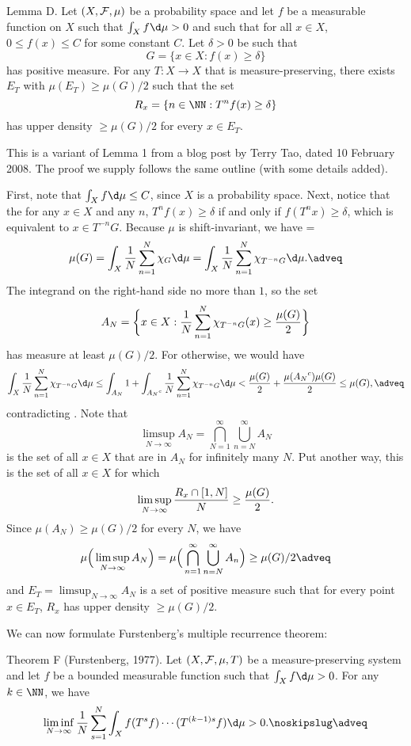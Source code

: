 \proclaim Lemma D. Let $(X,{\cal F},\mu)$ be a probability space and let $f$ be a measurable function on $X$
such that $\int_Xf\d\mu>0$ and such that for all $x\in X$, $0\leq f(x)\leq C$ for some constant $C$.
Let $\delta>0$ be such that
$$G = \{x\in X : f(x)\geq \delta\}$$
has positive measure. For any $T:X\to X$ that is measure-preserving,
there exists $E_T$ with $\mu(E_T)\geq \mu(G)/2$ such that the set
$$R_x = \{n\in \NN : T^nf(x) \geq \delta\}$$
has upper density $\geq \mu(G)/2$ for every $x\in E_T$.

\noindent This is a variant of Lemma 1 from a blog post by Terry Tao, dated 10 February 2008. The
proof we supply follows the same outline (with some details added).

\proof First, note that $\int_Xf\d\mu\leq C$, since $X$ is a probability space. Next, notice that
the for any $x\in X$ and any $n$, $T^nf(x)\geq \delta$ if and only if $f(T^nx)\geq \delta$,
which is equivalent to
$x\in T^{-n}G$. Because $\mu$ is shift-invariant, we have
\newcount\eqA
\eqA=\eqcount
$$\mu(G) = \int_X {1\over N} \sum_{n=1}^N \chi_{G}\d\mu = \int_X{1\over N}\sum_{n=1}^N \chi_{T^{-n}G}\d\mu.\adveq$$
The integrand on the right-hand side no more than $1$, so the set
$$A_N = \bigg\{ x\in X : {1\over N} \sum_{n=1}^N \chi_{T^{-n}G}(x)\geq {\mu(G)\over 2} \bigg\}$$
has measure at least $\mu(G)/2$. For otherwise, we would have
$$\int_X {1\over N}\sum_{n=1}^N \chi_{T^{-n}G}\d\mu \leq \int_{A_N} 1
  + \int_{{A_N}^c} {1\over N}\sum_{n=1}^N \chi_{T^{-n}G}\d\mu < {\mu(G)\over 2} + {\mu({A_N}^c)\mu(G)\over 2}
  \leq\mu(G),\adveq$$
contradicting . Note that
$$\limsup_{N\to\infty} A_N = \bigcap_{N=1}^\infty \bigcup_{n=N}^\infty A_N$$
is the set of all $x\in X$ that are in $A_N$ for infinitely many $N$. Put another way, this is the set
of all $x\in X$ for which
$$\limsup_{N\to\infty} {R_x \cap [1,N]\over N} \geq {\mu(G)\over 2}.$$
Since $\mu(A_N)\geq \mu(G)/2$ for every $N$, we have
$$\mu\Big(\limsup_{N\to\infty} A_N\Big) = \mu\Big(\bigcap_{n=1}^\infty \bigcup_{n=N}^\infty A_n\Big)\geq
\mu(G)/2\adveq$$
and $E_T = \limsup_{N\to\infty} A_N$ is a set of positive measure such that for every point $x\in E_T$,
$R_x$ has upper density $\geq \mu(G)/2$.\slug

\noindent We can now formulate Furstenberg's multiple recurrence theorem:

\parenproclaim Theorem F (Furstenberg, {\rm 1977}). Let $(X,{\cal F},\mu,T)$ be a measure-preserving
system and let $f$ be a bounded measurable function such that $\int_X f\d\mu >0$. For any $k\in \NN$, we have
$$\liminf_{N\to\infty} {1\over N} \sum_{s=1}^N \int_X f (T^sf)\cdots (T^{(k-1)s}f)\d\mu>0.\noskipslug\adveq$$

